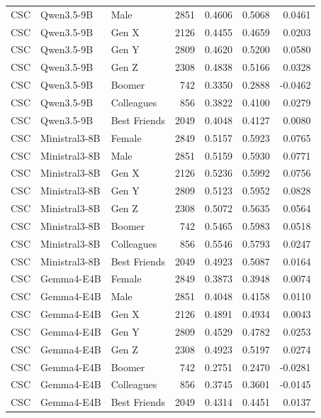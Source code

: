 \begin{longtable}{lllrrrr}
CSC & Qwen3.5-9B & Male & 2851 & 0.4606 & 0.5068 & 0.0461 \\
CSC & Qwen3.5-9B & Gen X & 2126 & 0.4455 & 0.4659 & 0.0203 \\
CSC & Qwen3.5-9B & Gen Y & 2809 & 0.4620 & 0.5200 & 0.0580 \\
CSC & Qwen3.5-9B & Gen Z & 2308 & 0.4838 & 0.5166 & 0.0328 \\
CSC & Qwen3.5-9B & Boomer & 742 & 0.3350 & 0.2888 & -0.0462 \\
CSC & Qwen3.5-9B & Colleagues & 856 & 0.3822 & 0.4100 & 0.0279 \\
CSC & Qwen3.5-9B & Best Friends & 2049 & 0.4048 & 0.4127 & 0.0080 \\
CSC & Ministral3-8B & Female & 2849 & 0.5157 & 0.5923 & 0.0765 \\
CSC & Ministral3-8B & Male & 2851 & 0.5159 & 0.5930 & 0.0771 \\
CSC & Ministral3-8B & Gen X & 2126 & 0.5236 & 0.5992 & 0.0756 \\
CSC & Ministral3-8B & Gen Y & 2809 & 0.5123 & 0.5952 & 0.0828 \\
CSC & Ministral3-8B & Gen Z & 2308 & 0.5072 & 0.5635 & 0.0564 \\
CSC & Ministral3-8B & Boomer & 742 & 0.5465 & 0.5983 & 0.0518 \\
CSC & Ministral3-8B & Colleagues & 856 & 0.5546 & 0.5793 & 0.0247 \\
CSC & Ministral3-8B & Best Friends & 2049 & 0.4923 & 0.5087 & 0.0164 \\
CSC & Gemma4-E4B & Female & 2849 & 0.3873 & 0.3948 & 0.0074 \\
CSC & Gemma4-E4B & Male & 2851 & 0.4048 & 0.4158 & 0.0110 \\
CSC & Gemma4-E4B & Gen X & 2126 & 0.4891 & 0.4934 & 0.0043 \\
CSC & Gemma4-E4B & Gen Y & 2809 & 0.4529 & 0.4782 & 0.0253 \\
CSC & Gemma4-E4B & Gen Z & 2308 & 0.4923 & 0.5197 & 0.0274 \\
CSC & Gemma4-E4B & Boomer & 742 & 0.2751 & 0.2470 & -0.0281 \\
CSC & Gemma4-E4B & Colleagues & 856 & 0.3745 & 0.3601 & -0.0145 \\
CSC & Gemma4-E4B & Best Friends & 2049 & 0.4314 & 0.4451 & 0.0137 \\
\end{longtable}
